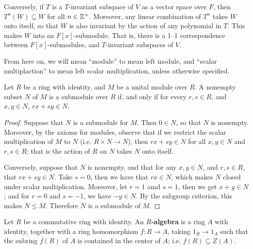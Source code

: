 \begin{example}[Polynomials]
\begin{enumerate}
            Conversely, if $T$ is a  $T$-invariant subspace of  $V$ as a vector
            space over  $F$, then  $T^n(W) \subseteq W$ for all $n \in \mathbb{Z}^+$.
            Moreover, any linear combination of  $T^n$ takes  $W$ onto itself,
            so that  $W$ is also invariant by the action of any polynomial in
            $T$. This makes  $W$ into an  $F[x]$-submodule. That is, there is a
            1--1 correspondence between $F[x]$-submodules, and $T$-invariant
            subspaces of  $V$.
    \end{enumerate}
\end{example}

\begin{remark}
    From here on, we will mean ``module'' to mean left module, and ``scalar
    multiplaction'' to mean left scalar multiplication, unless otherwise specified.
\end{remark}

\begin{lemma}\label{lemma_4.1.2}
    Let $R$ be a ring with identity, and $M$ be a unital module over $R$. A
    nonempty subset $N$ of $M$ is a submodule over  $R$ if, and only if for every
    $r,s \in R$, and  $x,y \in N$,  $rx+sy \in N$.
\end{lemma}
\begin{proof}
    Suppose that $N$ is a submodule for $M$. Then $0 \in N$, so that  $N$ is
    nonempty. Moreover, by the axioms for modules, observe that if we restrict
    the scalar multiplication of $M$ to $N$  (i.e. $R \times N \xrightarrow{}
    N$), then $rx+sy \in N$ for all  $x,y \in N$ and  $r,s \in R$; that is the
    action of $R$ on $N$ takes  $N$ onto itself.

    Conversely, suppose that $N$ is nonempty, and that for any $x,y \in N$, and
    $r,s \in R$, that  $rx+sy \in N$. Take  $s=0$, then we have that $rx \in N$,
    which makes $N$ closed under scalar multiplication. Moreover, let  $r=1$ amd
     $s=1$, then we get $x+y \in N$; and for  $r=0$ and  $s=-1$, we have $-y \in
     N$. By the subgroup criterion, this makes  $N \leq M$. Therefore  $N$ is a
     submodule of $M$.
\end{proof}

\begin{definition}
    Let $R$ be a commutative ring with identity. An \textbf{$R$-algebra} is a
    ring $A$ with identity, together with a ring homomorphism $f:R
    \xrightarrow{} A$, taking $1_R \xrightarrow{} 1_A$ such that the subring
    $f(R)$ of $A$ is contained in the center of  $A$; i.e.  $f(R) \subseteq
    Z(A)$.
\end{definition}

